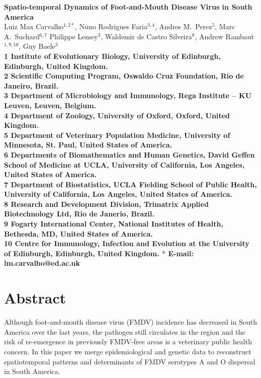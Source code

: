\documentclass[10pt]{article}
\date{}
\begin{document}
\begin{flushleft}
{\Large
\textbf{Spatio-temporal Dynamics of Foot-and-Mouth Disease Virus in South America}
}
\\
Luiz Max Carvalho$^{1,2\ast}$,
Nuno Rodrigues Faria$^{3,4}$,
Andres M.~Perez$^{5}$,
Marc A.~Suchard$^{6,7}$
Philippe Lemey$^{3}$,
Waldemir de Castro Silveira$^{8}$,
Andrew Rambaut$^{1,9,10}$,
Guy Baele$^{3}$
\\
\bf{1} Institute of Evolutionary Biology, University of Edinburgh, Edinburgh, United Kingdom.\\
\bf{2} Scientific Computing Program, Oswaldo Cruz Foundation, Rio de Janeiro, Brazil.\\
\bf{3} Department of Microbiology and Immunology, Rega Institute -- KU Leuven, Leuven, Belgium.\\
\bf{4} Department of Zoology, University of Oxford, Oxford, United Kingdom.\\
\bf{5} Department of Veterinary Population Medicine, University of Minnesota, St. Paul, United States of America.\\
\bf{6} Departments of Biomathematics and Human Genetics, David Geffen School of Medicine at UCLA, University of California, Los Angeles,  United States of America.\\
\bf{7} Department of Biostatistics, UCLA Fielding School of Public Health, University of California, Los Angeles,  United States of America.\\
\bf{8} Research and Development Division, Trimatrix Applied Biotechnology Ltd, Rio de Janerio, Brazil.\\
\bf{9}  Fogarty International Center, National Institutes of Health, Bethesda, MD,  United States of America.\\
\bf{10} Centre for Immunology, Infection and Evolution at the University of Edinburgh, Edinburgh, United Kingdom.
$\ast$ E-mail: lm.carvalho@ed.ac.uk
\end{flushleft}
\section*{Abstract}
Although foot-and-mouth disease virus (FMDV) incidence has decreased in South America over the last years, the pathogen still circulates in the region and the risk of re-emergence in previously FMDV-free areas is a veterinary public health concern.
In this paper we merge epidemiological and genetic data to reconstruct spatiotemporal patterns and determinants of FMDV serotypes A and O dispersal in South America.
\end{document}
